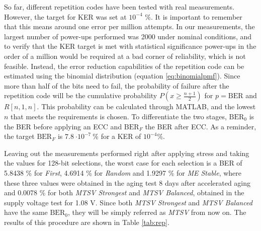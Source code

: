 So far, different repetition codes have been tested with real measurements. However, the target for KER was set at $10^{-4}$ \%. It is important to remember that this means around one error per million attempts. In our measurements, the largest number of power-ups performed was 2000 under nominal conditions, and to verify that the KER target is met with statistical significance power-ups in the order of a million would be required at a bad corner of reliability, which is not feasible. 
Instead, the error reduction capabilities of the repetition code can be estimated using the binomial distribution (equation \ref{eq:binomialpmf}).  Since more than half of the bits need to fail, the probability of failure after the repetition code will be the cumulative probability $P\left(x\geq \frac{n+1}{2}\right)$ for $p=\mathrm{BER}$ and $R[n,1,n]$. This probability can be calculated through MATLAB, and the lowest $n$ that meets the requirements is chosen. To differentiate the two stages, $\mathrm{BER}_0$ is the BER before applying an ECC and $\mathrm{BER}_F$ the BER after ECC. As a reminder, the target $\mathrm{BER}_F$ is $\SI{7.8}{\cdot 10^{-7}\ \%}$ for a KER of $10^{-4} \%$. 

Leaving out the measurements performed right after applying stress and taking the values for 128-bit selections, the worst case for each selection is a BER of 5.8438 \% for \textit{First}, 4.6914 \% for \textit{Random} and 1.9297 \% for \textit{ME Stable}, where these three values were obtained in the aging test 8 days after accelerated aging and 0.0078 \% for both \textit{MTSV Strongest} and \textit{MTSV Balanced}, obtained in the supply voltage test for 1.08 V. Since both \textit{MTSV Strongest} and \textit{MTSV Balanced} have the same $\mathrm{BER}_0$, they will be simply referred as \textit{MTSV} from now on. The results of this procedure are shown in Table \ref{tab:rep}.

 
 
 
 \begin{table}[H]
  \caption{Required repetition code to meet the KER target for each selection.}
  \label{tab:rep}%
\end{table}%

